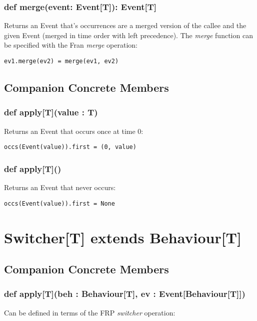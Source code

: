     \subsubsection*{def merge(event: Event[T]): Event[T]}
      Returns an Event that's occurrences
      are a merged version of the callee
      and the given Event (merged in time order
      with left precedence). The \emph{merge}
      function can be specified with the Fran \emph{merge}
      operation:

\begin{verbatim}
ev1.merge(ev2) = merge(ev1, ev2)
\end{verbatim}   

 \subsection*{Companion Concrete Members}
  \subsubsection*{def apply[T](value : T)}
    Returns an Event that occurs once at time 0:
  
\begin{verbatim}
occs(Event(value)).first = (0, value) 
\end{verbatim} 

  \subsubsection*{def apply[T]()}
    Returns an Event that never occurs:

\begin{verbatim}
occs(Event(value)).first = None
\end{verbatim} 

   \section*{Switcher[T] extends Behaviour[T]}
    \subsection*{Companion Concrete Members}
      \subsubsection*{def apply[T](beh : Behaviour[T], ev : Event[Behaviour[T]])}
        Can be defined in terms of the FRP \emph{switcher}
        operation:

